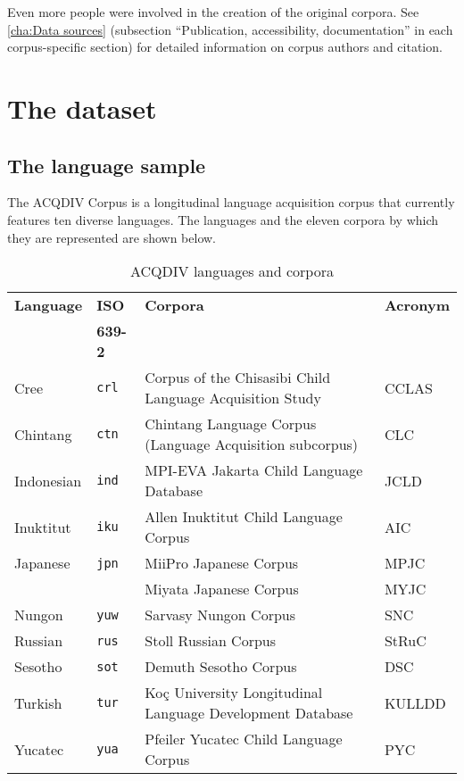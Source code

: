 \documentclass[a4paper, 11pt]{book}
\begin{document}
Even more people were involved in the creation of the original corpora. See \autoref{cha:Data sources} (subsection “Publication, accessibility, documentation” in each corpus-specific section) for detailed information on corpus authors and citation. 


\chapter{The dataset}
\label{cha:Overview of the dataset}

\section{The language sample}
\label{sec:The language sample}

The ACQDIV Corpus is a longitudinal language acquisition corpus that currently features ten diverse languages. The languages and the eleven corpora by which they are represented are shown below. 

\begin{table}[ht!]
	\centering
	\begin{tabular}{llll}
		\toprule
			\textbf{Language} 	& \textbf{ISO} 		& \textbf{Corpora}  & \textbf{Acronym} \\
								& \textbf{639-2}	&					& \\
		\midrule
			Cree 		& \texttt{crl} 		 & Corpus of the Chisasibi Child Language Acquisition Study 	& CCLAS \\
			Chintang 	& \texttt{ctn}  	 & Chintang Language Corpus (Language Acquisition subcorpus) 	& CLC \\
			Indonesian 	& \texttt{ind}  	 & MPI-EVA Jakarta Child Language Database 						& JCLD \\
			Inuktitut 	& \texttt{iku}  	 & Allen Inuktitut Child Language Corpus 						& AIC \\
			Japanese 	& \texttt{jpn}  	 & MiiPro Japanese Corpus 										& MPJC \\
						&					 & Miyata Japanese Corpus 										& MYJC \\
			Nungon	 	& \texttt{yuw}  	 & Sarvasy Nungon Corpus 										& SNC \\
			Russian 	& \texttt{rus}  	 & Stoll Russian Corpus 										& StRuC \\
			Sesotho 	& \texttt{sot}  	 & Demuth Sesotho Corpus 										& DSC \\
			Turkish 	& \texttt{tur}  	 & Koç University Longitudinal Language Development Database 	& KULLDD \\
			Yucatec 	& \texttt{yua}  	 & Pfeiler Yucatec Child Language Corpus 						& PYC \\
		\bottomrule
	\end{tabular}
	\caption{ACQDIV languages and corpora}
	\label{tab:ACQDIV languages and corpora}
\end{table}
\end{document}
